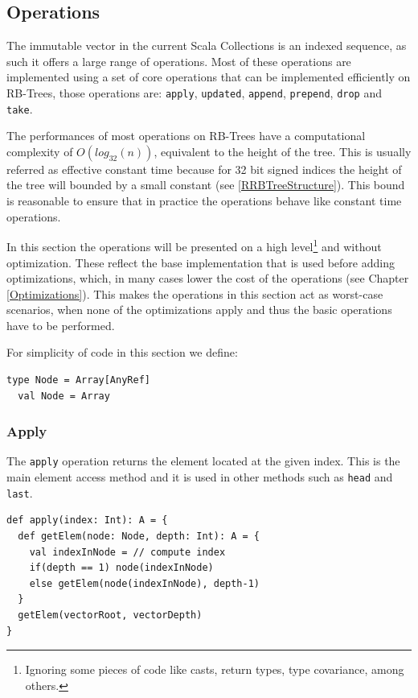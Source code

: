 \subsection{Operations}
\label{Operations}
The immutable vector in the current Scala Collections is an indexed sequence, as such it offers a large range of operations. Most of these operations are implemented using a set of core operations that can be implemented efficiently on RB-Trees, those operations are: \texttt{apply}, \texttt{updated}, \texttt{append}, \texttt{prepend}, \texttt{drop} and \texttt{take}. 

The performances of most operations on RB-Trees have a computational complexity of $O(log_{32}(n))$, equivalent to the height of the tree. This is usually referred as effective constant time because for 32 bit signed indices the height of the tree will bounded by a small constant (see \ref{RRBTreeStructure}). This bound is reasonable to ensure that in practice the operations behave like constant time operations.  
 
In this section the operations will be presented on a high level\footnote{Ignoring some pieces of code like casts, return types, type covariance, among others.} and without optimization. These reflect the base implementation that is used before adding optimizations, which, in many cases lower the cost of the operations (see Chapter \ref{Optimizations}). This makes the operations in this section act as worst-case scenarios, when none of the optimizations apply and thus the basic operations have to be performed.

For simplicity of code in this section we define:
\begin{lstlisting}[frame=single]
  type Node = Array[AnyRef]
  val Node = Array
\end{lstlisting}



\subsubsection{Apply}
\label{sec:apply}
The \texttt{apply} operation returns the element located at the given index. This is the main element access method and it is used in other methods such as \texttt{head} and \texttt{last}. 
\clearpage
\begin{lstlisting}[frame=single]
def apply(index: Int): A = {
  def getElem(node: Node, depth: Int): A = {
    val indexInNode = // compute index
    if(depth == 1) node(indexInNode)
    else getElem(node(indexInNode), depth-1) 
  }
  getElem(vectorRoot, vectorDepth)
}
\end{lstlisting}

